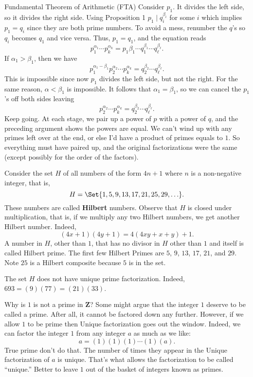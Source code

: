 \begin{Theorem}{Fundamental Theorem of Arithmetic (FTA)}{}
    Consider $ p_1 $. It divides the left side, so it divides the right side. Using Proposition 1
    $ p_1\mid q_i^{\beta_i} $ for some $i$ which implies $ p_1=q_i $ since they are both prime numbers.
    To avoid a mess, renumber the $ q $'s so $ q_i $ becomes $ q_1 $ and vice versa. Thus,
    $ p_1=q_1 $, and the equation reads
    \[ p_1^{\alpha_1}\cdots p_k^{\alpha_k}=p_1{\beta_1}\cdots q_1^{\beta_1}\cdots q_{\ell}^{\beta_{\ell}}. \]
    If $ \alpha_1>\beta_1 $, then we have
    \[ p_1^{\alpha_1-\beta_1}p_2^{\alpha_2}\cdots p_k^{\alpha_k}=q_2^{\beta_2}\cdots q_{\ell}^{\beta_{\ell}}. \]
    This is impossible since now $ p_1 $ divides the left side, but not the right. For the same reason, $ \alpha<\beta_1 $ is impossible.
    It follows that $ \alpha_1=\beta_1 $, so we can cancel the $ p_1 $'s off both sides leaving
    \[ p_2^{\alpha_2}\cdots p_k^{\alpha_k}=q_2^{\beta_2}\cdots q_{\ell}^{\beta_{\ell}}. \]
    Keep going. At each stage, we pair up a power of $p$ with a power of $q$, and the
    preceding argument shows the powers are equal. We can't wind up with any primes
    left over at the end, or else I'd have a product of primes equals to $1$. So everything
    must have paired up, and the original factorizations were the same (except possibly
    for the order of the factors).
\end{Theorem}
\begin{Example}{}{}
    Consider the set $H$ of all numbers of the form $4n + 1$ where $n$ is
    a non-negative integer, that is,
    \[ H=\Set{1,5,9,13,17,21,25,29,\ldots}. \]
    These numbers are called \textbf{Hilbert} numbers. Observe that $H$ is closed under
    multiplication, that is, if we multiply any two Hilbert numbers, we get another
    Hilbert number. Indeed,
    \[ (4x+1)(4y+1)=4(4xy+x+y)+1. \]
    A number in $H$, other than $1$, that has no divisor in $H$ other than $1$ and itself
    is called Hilbert prime. The first few Hilbert Primes are $5$, $ 9 $, $ 13 $, $ 17 $, $ 21 $, and $ 29 $.
    Note $25$ is a Hilbert composite because $5$ is in the set.

    The set $H$ does not have unique prime factorization. Indeed, $693 = (9)(77) = (21)(33)$.
\end{Example}
\begin{Example}{Why is $1$ is not a prime in $ \mathbf{Z} $?}{}
    Some might argue that the integer $1$ deserve to be called a prime. After all,
    it cannot be factored down any further. However, if we allow $1$ to be prime then
    Unique factorization goes out the window. Indeed, we can factor the integer $1$ from
    any integer $a$ as much as we like:
    \[ a=(1)(1)(1)\cdots(1)(a). \]
    True prime don't do that. The number of times they appear in the Unique factorization of $a$ is unique.
    That's what allows the factorization to be called ``unique.''
    Better to leave $1$ out of the basket of integers known as primes.
\end{Example}
